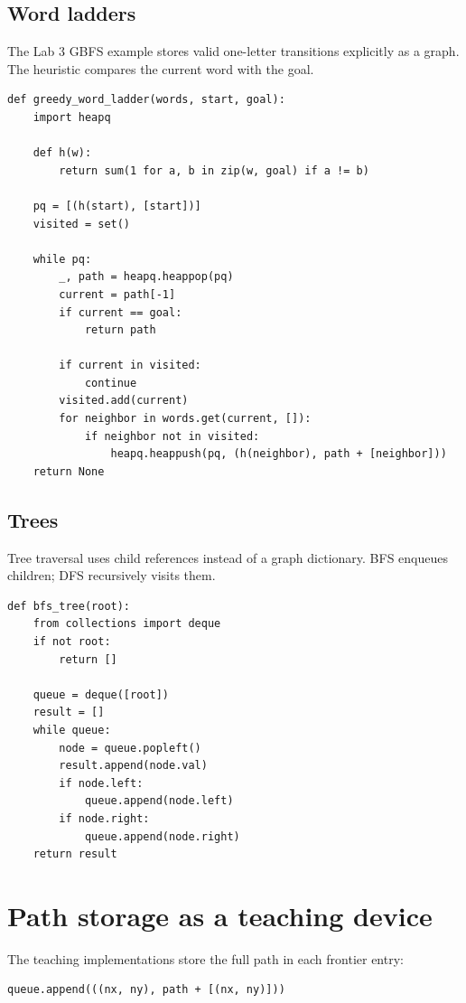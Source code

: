 \subsection{Word ladders}
The Lab 3 GBFS example stores valid one-letter transitions explicitly as a graph. The heuristic compares the current word with the goal.

\begin{lstlisting}[style=mlpython]
def greedy_word_ladder(words, start, goal):
    import heapq

    def h(w):
        return sum(1 for a, b in zip(w, goal) if a != b)

    pq = [(h(start), [start])]
    visited = set()

    while pq:
        _, path = heapq.heappop(pq)
        current = path[-1]
        if current == goal:
            return path

        if current in visited:
            continue
        visited.add(current)
        for neighbor in words.get(current, []):
            if neighbor not in visited:
                heapq.heappush(pq, (h(neighbor), path + [neighbor]))
    return None
\end{lstlisting}

\subsection{Trees}
Tree traversal uses child references instead of a graph dictionary. BFS enqueues children; DFS recursively visits them.

\begin{lstlisting}[style=mlpython]
def bfs_tree(root):
    from collections import deque
    if not root:
        return []

    queue = deque([root])
    result = []
    while queue:
        node = queue.popleft()
        result.append(node.val)
        if node.left:
            queue.append(node.left)
        if node.right:
            queue.append(node.right)
    return result
\end{lstlisting}

\section{Path storage as a teaching device}

The teaching implementations store the full path in each frontier entry:

\begin{lstlisting}[style=mlpython]
queue.append(((nx, ny), path + [(nx, ny)]))
\end{lstlisting}

